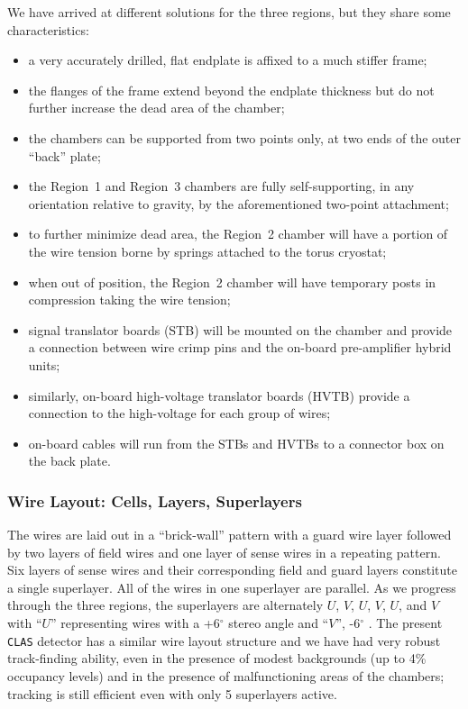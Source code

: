 \documentclass[12pt]{article}
\def\degg{$^{\circ}$ }
\begin{document}
We have arrived at different solutions for the three regions, but they
share some characteristics:

\begin{itemize}
\item a very accurately drilled, flat endplate is affixed to a much stiffer
frame;
\item the flanges of the frame extend beyond the endplate thickness but
do not further increase the dead area of the chamber;
\item the chambers can be supported from two points only, at two ends of
the outer ``back'' plate;
\item the Region~1 and Region~3 chambers are fully self-supporting, in any 
orientation relative to gravity, by the aforementioned two-point attachment;
\item to further minimize dead area, the Region~2 chamber will have a portion
of the wire tension borne by springs attached to the torus cryostat;
\item when out of position, the Region~2 chamber will have temporary posts
in compression taking the wire tension;
\item signal translator boards (STB) will be mounted on the chamber and
provide a connection between wire crimp pins and the on-board pre-amplifier
hybrid units;
\item similarly, on-board high-voltage translator boards (HVTB) provide a
connection to the high-voltage for each group of wires;
\item on-board cables will run from the STBs and HVTBs to a connector
box on the back plate.
\end{itemize}

\subsubsection{Wire Layout: Cells, Layers, Superlayers}

The wires are laid out in a ``brick-wall'' pattern with a guard wire
layer followed by two layers of field wires and one layer of sense
wires in a repeating pattern.  Six layers of sense wires and their 
corresponding field and guard layers constitute a single superlayer.
All of the wires in one superlayer are parallel.  As we progress through
the three regions, the superlayers are alternately $U$, $V$, $U$, $V$, 
$U$, and $V$ with ``$U$'' representing wires with a +6\degg stereo angle 
and ``$V$'', -6\degg.  The present {\tt CLAS} detector has a similar wire 
layout structure and we have had very robust track-finding ability, even in 
the presence of modest backgrounds (up to 4\% occupancy levels) and in the 
presence of malfunctioning areas of the chambers; tracking is still 
efficient even with only 5 superlayers active.
\end{document}
